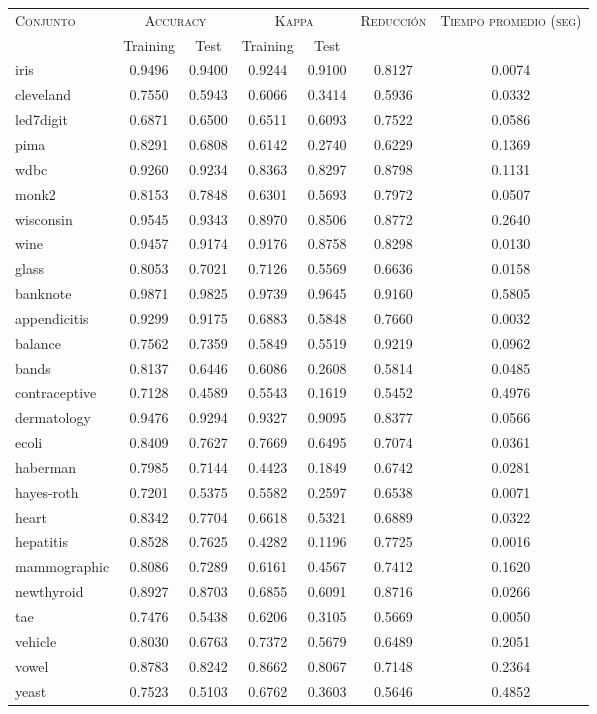 \begin{table}[]
\centering
\begin{tabular}{l c c c c c c}
\hline
\multirow{2}{*}{\textsc{Conjunto}}
	& \multicolumn{2}{c}{\textsc{Accuracy}}
	& \multicolumn{2}{c}{\textsc{Kappa}}
	& \textsc{Reducción}
	& \textsc{Tiempo promedio (seg)} \\
	& Training & Test
	& Training & Test \\ 
\hline
\hline

iris & 0.9496 & 0.9400 & 0.9244 & 0.9100 & 0.8127 & 0.0074 \\
cleveland & 0.7550 & 0.5943 & 0.6066 & 0.3414 & 0.5936 & 0.0332 \\
led7digit & 0.6871 & 0.6500 & 0.6511 & 0.6093 & 0.7522 & 0.0586 \\
pima & 0.8291 & 0.6808 & 0.6142 & 0.2740 & 0.6229 & 0.1369 \\
wdbc & 0.9260 & 0.9234 & 0.8363 & 0.8297 & 0.8798 & 0.1131 \\
monk2 & 0.8153 & 0.7848 & 0.6301 & 0.5693 & 0.7972 & 0.0507 \\
wisconsin & 0.9545 & 0.9343 & 0.8970 & 0.8506 & 0.8772 & 0.2640 \\
wine & 0.9457 & 0.9174 & 0.9176 & 0.8758 & 0.8298 & 0.0130 \\
glass & 0.8053 & 0.7021 & 0.7126 & 0.5569 & 0.6636 & 0.0158 \\
banknote & 0.9871 & 0.9825 & 0.9739 & 0.9645 & 0.9160 & 0.5805 \\
appendicitis & 0.9299 & 0.9175 & 0.6883 & 0.5848 & 0.7660 & 0.0032 \\
balance & 0.7562 & 0.7359 & 0.5849 & 0.5519 & 0.9219 & 0.0962 \\
bands & 0.8137 & 0.6446 & 0.6086 & 0.2608 & 0.5814 & 0.0485 \\
contraceptive & 0.7128 & 0.4589 & 0.5543 & 0.1619 & 0.5452 & 0.4976 \\
dermatology & 0.9476 & 0.9294 & 0.9327 & 0.9095 & 0.8377 & 0.0566 \\
ecoli & 0.8409 & 0.7627 & 0.7669 & 0.6495 & 0.7074 & 0.0361 \\
haberman & 0.7985 & 0.7144 & 0.4423 & 0.1849 & 0.6742 & 0.0281 \\
hayes-roth & 0.7201 & 0.5375 & 0.5582 & 0.2597 & 0.6538 & 0.0071 \\
heart & 0.8342 & 0.7704 & 0.6618 & 0.5321 & 0.6889 & 0.0322 \\
hepatitis & 0.8528 & 0.7625 & 0.4282 & 0.1196 & 0.7725 & 0.0016 \\
mammographic & 0.8086 & 0.7289 & 0.6161 & 0.4567 & 0.7412 & 0.1620 \\
newthyroid & 0.8927 & 0.8703 & 0.6855 & 0.6091 & 0.8716 & 0.0266 \\
tae & 0.7476 & 0.5438 & 0.6206 & 0.3105 & 0.5669 & 0.0050 \\
vehicle & 0.8030 & 0.6763 & 0.7372 & 0.5679 & 0.6489 & 0.2051 \\
vowel & 0.8783 & 0.8242 & 0.8662 & 0.8067 & 0.7148 & 0.2364 \\
yeast & 0.7523 & 0.5103 & 0.6762 & 0.3603 & 0.5646 & 0.4852 \\



\end{tabular}
\end{table}
